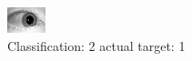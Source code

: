 \begin{figure}[h!]
\begin{center}
\includegraphics[width=0.60\columnwidth]{figures/ID1481_class_2_target_1.png}
\end{center}
\caption{ Classification: 2 actual target: 1}
\label{fig:ID1481_class_2_target_1}
\end{figure}
